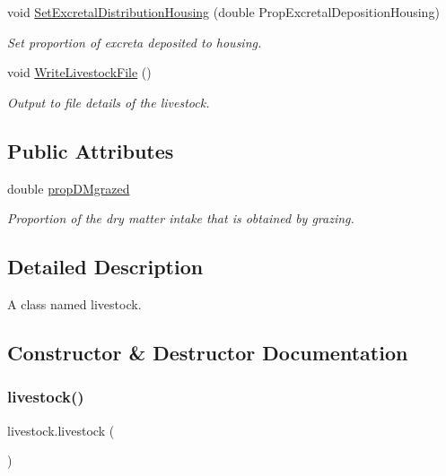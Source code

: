 \begin{DoxyCompactItemize}
void \mbox{\hyperlink{classlivestock_aae778774f618bd97cf190c55e8ad179f}{Set\+Excretal\+Distribution\+Housing}} (double Prop\+Excretal\+Deposition\+Housing)
\begin{DoxyCompactList}\small\item\em Set proportion of excreta deposited to housing. \end{DoxyCompactList}\item 
void \mbox{\hyperlink{classlivestock_a23c5edb2e2568bbcbe7357d56b6a5fb9}{Write\+Livestock\+File}} ()
\begin{DoxyCompactList}\small\item\em Output to file details of the livestock. \end{DoxyCompactList}\end{DoxyCompactItemize}
\subsection*{Public Attributes}
\begin{DoxyCompactItemize}
\item 
double \mbox{\hyperlink{classlivestock_a4dbd96b6381bb6910c2b9af29955c991}{prop\+D\+Mgrazed}}
\begin{DoxyCompactList}\small\item\em Proportion of the dry matter intake that is obtained by grazing. \end{DoxyCompactList}\end{DoxyCompactItemize}


\subsection{Detailed Description}
A class named livestock. 

\subsection{Constructor \& Destructor Documentation}
\mbox{\label{classlivestock_a0f351330e7211a1c52533fb79f37ac3d}} 
\subsubsection{\texorpdfstring{livestock()}{livestock()}\hspace{0.1cm}{\footnotesize\ttfamily [1/2]}}
{\footnotesize\ttfamily livestock.\+livestock (\begin{DoxyParamCaption}{ }\end{DoxyParamCaption})\hspace{0.3cm}{\ttfamily [inline]}}




